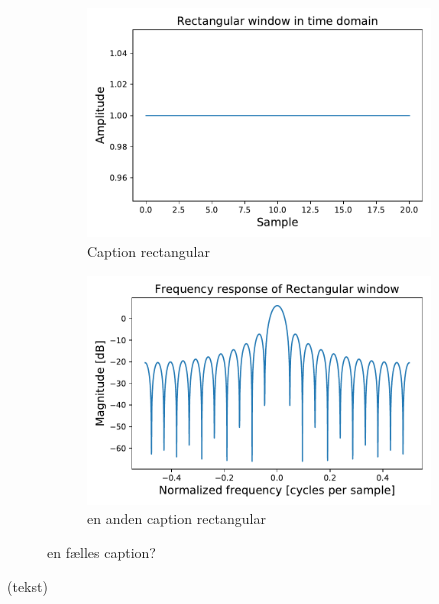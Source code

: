 \begin{figure}[H]
    \centering
    \begin{subfigure}[b]{.49\textwidth}
        \centering
        \includegraphics[width=\textwidth]{figures/RectangularTime.pdf}
        \caption{Caption rectangular}
        \label{fig:RectangularTime}
    \end{subfigure}
    \begin{subfigure}[b]{.49\textwidth}
        \centering
        \includegraphics[width=\textwidth]{figures/RectangularFourier.pdf}
        \caption{en anden caption rectangular}
        \label{fig:RectangularFourier}
    \end{subfigure}
\caption{en fælles caption?}
\label{fig: Rectangular}
\end{figure}
(tekst)


